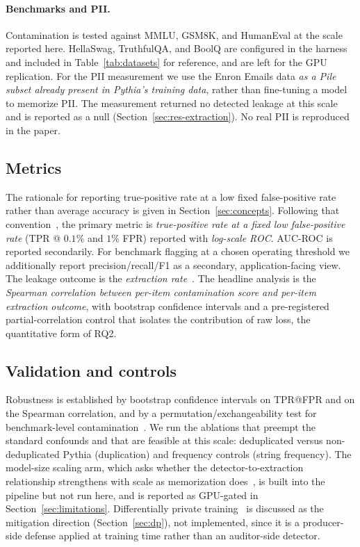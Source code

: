 

\paragraph{Benchmarks and PII.} Contamination is tested against MMLU, GSM8K, and
HumanEval at the scale reported here. HellaSwag, TruthfulQA, and BoolQ are configured in
the harness and included in Table~\ref{tab:datasets} for reference, and are left for the
GPU replication. For the PII measurement we use the Enron Emails data \emph{as a Pile
subset already present in Pythia's training data}, rather than fine-tuning a model to
memorize PII. The measurement returned no detected leakage at this scale and is reported
as a null (Section~\ref{sec:res-extraction}). No real PII is reproduced in the paper.

\subsection{Metrics}
The rationale for reporting true-positive rate at a low fixed false-positive rate rather
than average accuracy is given in Section~\ref{sec:concepts}. Following that
convention~\citep{carlini2022lira}, the primary metric is \emph{true-positive rate at a
fixed low false-positive rate} (TPR @ $0.1\%$ and $1\%$ FPR) reported with
\emph{log-scale ROC}. AUC-ROC is reported secondarily. For benchmark flagging at a chosen
operating threshold we additionally
report precision/recall/F1 as a secondary, application-facing view. The leakage outcome
is the \emph{extraction rate}~\citep{carlini2023quantifying}. The headline analysis is
the \emph{Spearman correlation between per-item contamination score and per-item
extraction outcome}, with bootstrap confidence intervals and a pre-registered
partial-correlation control that isolates the contribution of raw loss, the quantitative
form of RQ2.

\subsection{Validation and controls}
Robustness is established by bootstrap confidence intervals on TPR@FPR and on the
Spearman correlation, and by a permutation/exchangeability test for benchmark-level
contamination~\citep{oren2024proving}. We run the ablations that preempt the standard
confounds and that are feasible at this scale: deduplicated versus non-deduplicated
Pythia (duplication) and frequency controls (string frequency). The model-size scaling
arm, which asks whether the detector-to-extraction relationship strengthens with scale as
memorization does~\citep{carlini2023quantifying}, is built into the pipeline but not run
here, and is reported as GPU-gated in Section~\ref{sec:limitations}. Differentially private
training~\citep{abadi2016deep,li2022dpllm} is discussed as the mitigation direction
(Section~\ref{sec:dp}), not implemented, since it is a producer-side defense applied at
training time rather than an auditor-side detector.


